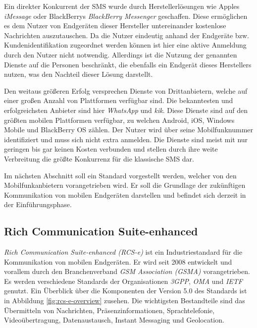 \documentclass[german,12pt,a4paper]{article}
\begin{document}
 Ein direkter Konkurrent der SMS wurde durch Herstellerlösungen wie Apples \textit{iMessage} oder
 BlackBerrys \textit{BlackBerry Messenger} geschaffen. Diese ermöglichen es dem Nutzer von Endgeräten
 dieser Hersteller untereinander kostenlose Nachrichten auszutauschen. Da die Nutzer eindeutig
 anhand der Endgeräte bzw. Kundenidentifikation zugeordnet werden können ist hier eine aktive
 Anmeldung durch den Nutzer nicht notwendig. Allerdings ist die Nutzung der genannten Dienste auf die
 Personen beschränkt, die ebenfalls ein Endgerät dieses Herstellers nutzen, was den Nachteil dieser
 Lösung darstellt.

 Den weitaus größeren Erfolg versprechen Dienste von Drittanbietern, welche auf einer großen Anzahl
 von Plattformen verfügbar sind. Die bekanntesten und erfolgreichsten Anbieter sind hier
 \textit{WhatsApp} und \textit{kik}. Diese Dienste sind auf den größten mobilen Plattformen
 verfügbar, zu welchen Android, iOS, Windows Mobile und BlackBerry OS zählen. Der Nutzer wird über
 seine Mobilfunknummer identifiziert und muss sich nicht extra anmelden. Die Dienste sind meist mit
 nur geringen bis gar keinen Kosten verbunden und stellen durch ihre weite Verbreitung die größte
 Konkurrenz für die klassische SMS dar.

 Im nächsten Abschnitt soll ein Standard vorgestellt werden, welcher von den Mobilfunkanbietern
 vorangetrieben wird. Er soll die Grundlage der zukünftigen Kommunikation von mobilen Endgeräten
 darstellen und befindet sich derzeit in der Einführungsphase.


 \subsection{Rich Communication Suite-enhanced} %
 \label{sub:rcs-e}

  \textit{Rich Communication Suite-enhanced (RCS-e)} ist ein Industriestandard für die
  Kommunikation von mobilen Endgeräten. Er wird seit 2008 entwickelt und vorallem durch den
  Branchenverband \textit{GSM Association (GSMA)} vorangetrieben. Es werden verschiedene Standards der
  Organisationen \textit{3GPP}, \textit{OMA} und \textit{IETF} genutzt. Ein Überblick über die
  Komponenten der Version 5.0 des Standards ist in Abbildung \ref{fig:rcs-e-overview} zusehen.
  Die wichtigsten Bestandteile sind das Übermitteln von Nachrichten, Präsenzinformationen,
  Sprachtelefonie, Videoübertragung, Datenaustausch, Instant Messaging und Geolocation.
\end{document}
